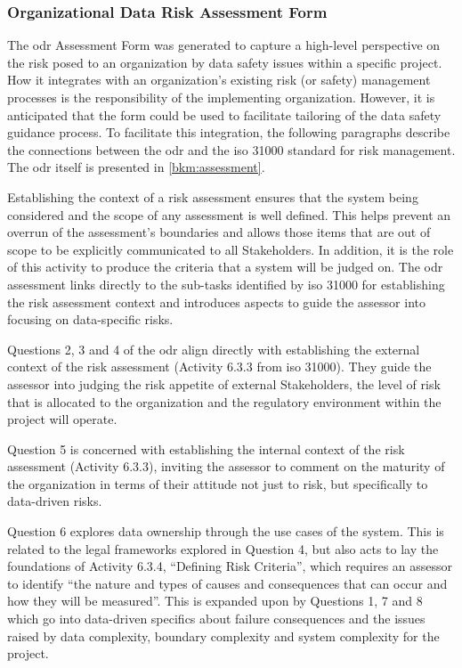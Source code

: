 \subsubsection{Organizational Data Risk Assessment Form}
The \gls{odr} Assessment Form was generated to capture a high-level perspective on the risk posed to an organization by data safety issues within a specific project. How it integrates with an organization's existing risk (or safety) management processes is the responsibility of the implementing organization.
However, it is anticipated that the form could be used to facilitate tailoring of the data safety guidance process.
To facilitate this integration, the following paragraphs describe the connections between the \gls{odr} and the
\acrshort{iso} 31000 \cite{citation:iso310002018risk}
standard for risk management.
The \gls{odr} itself is presented in \autoref{bkm:assessment}.

Establishing the context of a risk assessment ensures that the system being considered and the scope of any assessment is well defined. This helps prevent an overrun of the assessment's boundaries and allows those items that are out of scope to be explicitly communicated to all Stakeholders. In addition, it is the role of this activity to produce the criteria that a system will be judged on. The \gls{odr} assessment links directly to the sub-tasks identified by \acrshort{iso} 31000 for establishing the risk assessment context and introduces aspects to guide the assessor into focusing on data-specific risks.

Questions 2, 3 and 4 of the \gls{odr} align directly with establishing the external context of the risk assessment
(Activity 6.3.3 from \acrshort{iso} 31000).
They guide the assessor into judging the risk appetite of external Stakeholders, the level of risk that is allocated to the organization and the regulatory environment within the project will operate.

Question 5 is concerned with establishing the internal context of the risk assessment
(Activity 6.3.3),
inviting the assessor to comment on the maturity of the organization in terms of their attitude not just to risk, but specifically to data-driven risks.

Question 6 explores data ownership through the use cases of the system. This is related to the legal frameworks explored in Question 4, but also acts to lay the foundations of Activity
6.3.4,
``Defining Risk Criteria'', which requires an assessor to identify ``the nature and types of causes and consequences that can occur and how they will be measured''. This is expanded upon by Questions 1, 7 and 8 which go into data-driven specifics about failure consequences and the issues raised by data complexity, boundary complexity and system complexity for the project.

